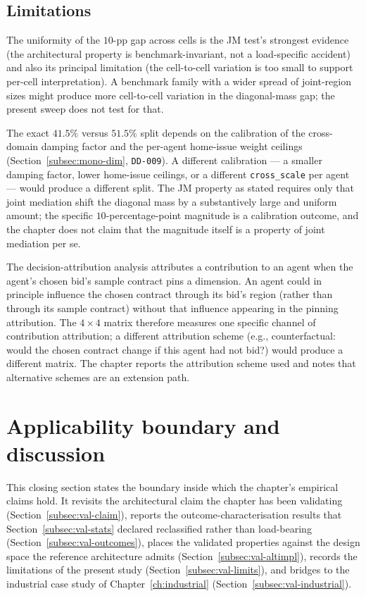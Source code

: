 \subsection*{Limitations}

The uniformity of the $10$-pp gap across cells is the JM test's
strongest evidence (the architectural property is benchmark-invariant,
not a load-specific accident) and also its principal limitation
(the cell-to-cell variation is too small to support per-cell
interpretation). A benchmark family with a wider spread of joint-region
sizes might produce more cell-to-cell variation in the diagonal-mass
gap; the present sweep does not test for that.

The exact $41.5\%$ versus $51.5\%$ split depends on the calibration
of the cross-domain damping factor and the per-agent home-issue
weight ceilings (Section~\ref{subsec:mono-dim}, \texttt{DD-009}).
A different calibration --- a smaller damping factor, lower home-issue
ceilings, or a different \texttt{cross\_scale} per agent --- would
produce a different split. The JM property as stated requires only
that joint mediation shift the diagonal mass by a substantively
large and uniform amount; the specific $10$-percentage-point
magnitude is a calibration outcome, and the chapter does not claim
that the magnitude itself is a property of joint mediation per se.

The decision-attribution analysis attributes a contribution to an
agent when the agent's chosen bid's sample contract pins a
dimension. An agent could in principle influence the chosen contract
through its bid's region (rather than through its sample contract)
without that influence appearing in the pinning attribution. The
$4 \times 4$ matrix therefore measures one specific channel of
contribution attribution; a different attribution scheme (e.g.,
counterfactual: would the chosen contract change if this agent had
not bid?) would produce a different matrix. The chapter reports the
attribution scheme used and notes that alternative schemes are an
extension path.

\section{Applicability boundary and discussion}
\label{sec:val-boundary}

This closing section states the boundary inside which the chapter's
empirical claims hold. It revisits the architectural claim the
chapter has been validating (Section~\ref{subsec:val-claim}), reports
the outcome-characterisation results that
Section~\ref{subsec:val-stats} declared reclassified rather than
load-bearing (Section~\ref{subsec:val-outcomes}), places the
validated properties against the design space the reference
architecture admits (Section~\ref{subsec:val-altimpl}), records the
limitations of the present study (Section~\ref{subsec:val-limits}),
and bridges to the industrial case study of
Chapter~\ref{ch:industrial} (Section~\ref{subsec:val-industrial}).

